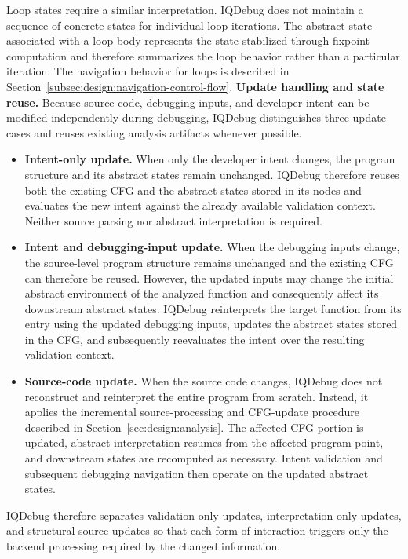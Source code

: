 \documentclass[11pt,oneside]{report}
\theoremstyle{plain}
\theoremstyle{definition}
\theoremstyle{remark}
\begin{document}
Loop states require a similar interpretation. IQDebug does not maintain a sequence of concrete states for individual loop iterations. The abstract state associated with a loop body represents the state stabilized through fixpoint computation and therefore summarizes the loop behavior rather than a particular iteration. The navigation behavior for loops is described in Section~\ref{subsec:design:navigation-control-flow}.
\smallskip
\noindent\textbf{Update handling and state reuse.}
Because source code, debugging inputs, and developer intent can be modified independently during debugging, IQDebug distinguishes three update cases and reuses existing analysis artifacts whenever possible.
\begin{itemize}
    \item \textbf{Intent-only update.}
    When only the developer intent changes, the program structure and its abstract states remain unchanged.
    IQDebug therefore reuses both the existing CFG and the abstract states stored in its nodes and evaluates the new intent against the already available validation context.
    Neither source parsing nor abstract interpretation is required.
    \item \textbf{Intent and debugging-input update.}
    When the debugging inputs change, the source-level program structure remains unchanged and the existing CFG can therefore be reused.
    However, the updated inputs may change the initial abstract environment of the analyzed function and consequently affect its downstream abstract states.
    IQDebug reinterprets the target function from its entry using the updated debugging inputs, updates the abstract states stored in the CFG, and subsequently reevaluates the intent over the resulting validation context.
    \item \textbf{Source-code update.}
    When the source code changes, IQDebug does not reconstruct and reinterpret the entire program from scratch.
    Instead, it applies the incremental source-processing and CFG-update procedure described in Section~\ref{sec:design:analysis}.
    The affected CFG portion is updated, abstract interpretation resumes from the affected program point, and downstream states are recomputed as necessary.
    Intent validation and subsequent debugging navigation then operate on the updated abstract states.

\end{itemize}
IQDebug therefore separates validation-only updates, interpretation-only updates, and structural source updates so that each form of interaction triggers only the backend processing required by the changed information.
\end{document}

